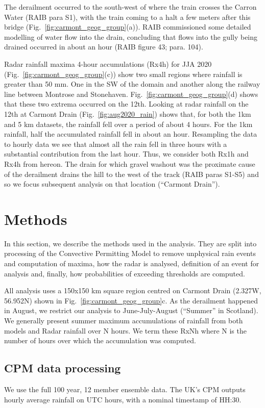 \documentclass[11pt,a4paper]{article}
\begin{document}
The derailment occurred to the south-west of where the train crosses the Carron Water (RAIB para S1), with the train coming to a halt a few meters after this bridge (Fig.~\ref{fig:carmont_geog_group}(a)).  RAIB commissioned some detailed modelling of water flow into the drain, concluding that flows into the gully being drained occurred in about an hour (RAIB figure 43; para. 104). 


Radar rainfall maxima 4-hour accumulations (Rx4h) for JJA 2020 (Fig.~\ref{fig:carmont_geog_group}(c)) show two small regions  where rainfall is greater than 50 mm. One in the SW of the domain and another along the railway line between Montrose and Stonehaven. Fig.~\ref{fig:carmont_geog_group}(d) shows that these two extrema occurred on the 12th. Looking at radar rainfall on the 12th at Carmont Drain (Fig.~\ref{fig:aug2020_rain}) shows that, for both the 1km and 5 km datasets, the rainfall fell over a period of about 4 hours. For the 1km rainfall, half the accumulated rainfall fell in about an hour.  Resampling the data to hourly data we see that almost all the rain fell in three hours with a substantial contribution from the last hour. Thus, we consider both Rx1h and Rx4h from hereon. The drain for which gravel washout was the proximate cause of the derailment drains the hill to the west of the track (RAIB paras S1-S5) and so we focus subsequent analysis on that location (``Carmont Drain'').

\section{Methods}
In this section, we describe the methods used in the analysis. They are split into processing of the Convective Permitting Model to remove unphysical rain events  and computation of maxima, how the radar is analysed, definition of an event for analysis and, finally, how probabilities of exceeding thresholds are computed. 

All analysis uses a 150x150 km square region centred on Carmont Drain (2.327W, 56.952N) shown in Fig.~\ref{fig:carmont_geog_group}c. As the derailment happened in August, we restrict our analysis to June-July-August (``Summer'' in Scotland).  We generally present summer  maximum accumulations of rainfall from both models and Radar rainfall over N hours. We term these RxNh where N is the number of hours over which the accumulation was computed. 

\subsection{CPM data processing}
\label{subsect:cpm_data}
We use the full 100 year, 12 member ensemble data. The UK's CPM outputs hourly average rainfall on UTC hours, with a nominal timestamp of HH:30. 
\end{document}
